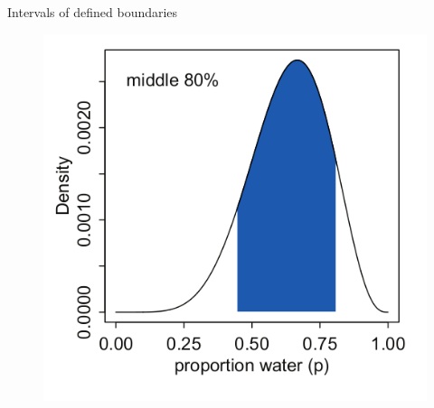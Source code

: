 \documentclass[handout]{beamer}
\begin{document}
\begin{frame}{Intervals of defined boundaries}
\scriptsize{

   \begin{figure}[h!]
	\centering
	\includegraphics[scale=0.45]{pics/interval4.png}
	\end{figure} 




} 

\end{frame}
\end{document}
